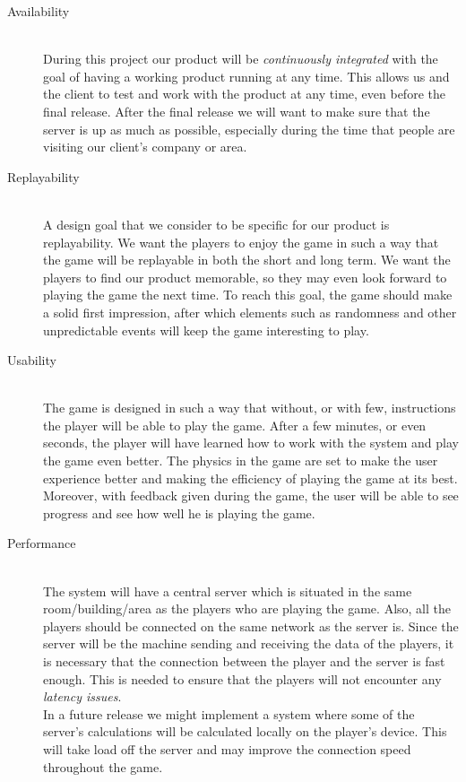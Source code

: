 \documentclass[11pt,twoside,a4paper]{article}
\begin{document}
\begin{description}
\item[Availability] \hfill \\
    During this project our product will be \emph{continuously integrated} with the goal of having a working product running at any time. This allows us and the client to test and work with the product at any time, even before the final release.
After the final release we will want to make sure that the server is up as much as possible, especially during the time that people are visiting our client's company or area. 
\item[Replayability] \hfill \\
    A design goal that we consider to be specific for our product is replayability. We want the players to enjoy the game in such a way that the game will be replayable in both the short and long term. We want the players to find our product memorable, so they may even look forward to playing the game the next time. To reach this goal, the game should make a solid first impression, after which elements such as randomness and other unpredictable events will keep the game interesting to play.
\item[Usability] \hfill \\
    The game is designed in such a way that without, or with few, instructions the player will be able to play the game. After a few minutes, or even seconds, the player will have learned how to work with the system and play the game even better. The physics in the game are set to make the user experience better and making the efficiency of playing the game at its best. \\
		Moreover, with feedback given during the game, the user will be able to see progress and see how well he is playing the game.
\item[Performance] \hfill \\
    The system will have a central server which is situated in the same room/building/area as the players who are playing the game. Also, all the players should be connected on the same network as the server is. Since the server will be the machine sending and receiving the data of the players, it is necessary that the connection between the player and the server is fast enough. This is needed to ensure that the players will not encounter any \emph{latency issues}. \\
    In a future release we might implement a system where some of the server's calculations will be calculated locally on the player's device. This will take load off the server and may improve the connection speed throughout the game.
    
\end{description}
\end{document}
